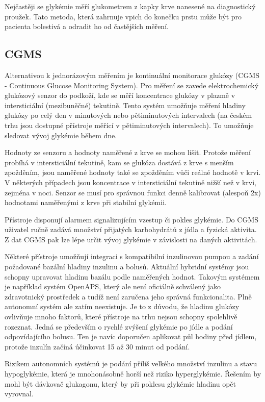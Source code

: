 Nejčastěji se glykémie měří glukometrem z kapky krve nanesené na diagnostický proužek. Tato metoda, která zahrnuje vpich do konečku prstu může být pro pacienta bolestivá a odradit ho od častějších měření. \cite{Diabetes.Pelikan}

\subsection{CGMS}

Alternativou k jednorázovým měřením je kontinuální monitorace glukózy (CGMS - Continuous Glucose Monitoring System). Pro měření se zavede elektrochemický glukózový senzor do podkoží, kde se měří koncentrace glukózy v plazmě v intersticiální (mezibuněčné) tekutině. Tento systém umožňuje měření hladiny glukózy po celý den v minutových nebo pětiminutových intervalech (na českém trhu jsou dostupné přístroje měřící v pětiminutových intervalech). To umožňuje sledovat vývoj glykémie během dne.

Hodnoty ze senzoru a hodnoty naměřené z krve se mohou lišit. Protože měření probíhá v intersticiální tekutině, kam se glukóza dostává z krve s menším zpožděním, jsou naměřené hodnoty také se zpožděním vůči reálné hodnotě v krvi. V některých případech jsou koncentrace v intersticiální tekutině nižší než v krvi, zejména v noci. Senzor se musí pro správnou funkci denně kalibrovat (alespoň 2x) hodnotami naměřenými z krve při stabilní glykémii. \citep{Diabetes.Perusicova}

Přístroje disponují alarmem signalizujícím vzestup či pokles glykémie. Do CGMS uživatel ručně zadává množství přijatých karbohydrátů z jídla a fyzická aktivita. Z dat CGMS pak lze lépe určit vývoj glykémie v závislosti na daných aktivitách.

Některé přístroje umožňují integraci s kompatibilní inzulinovou pumpou a zadání požadované bazální hladiny inzulinu a bolusů. Aktuální hybridní systémy jsou schopny upravovat hladinu bazálu podle naměřených hodnot. Takovým systémem je například systém OpenAPS, který ale není oficiálně schválený jako zdravotnický prostředek a tudíž není zaručena jeho správná funkcionalita. Plně autonomní systém ale zatím neexistuje. Je to z důvodu, že hladinu glukózy ovlivňuje mnoho faktorů, které přístroje na trhu nejsou schopny spolehlivě rozeznat. Jedná se především o rychlé zvýšení glykémie po jídle a podání odpovídajícího bolusu. Ten je navíc doporučen aplikovat půl hodiny před jídlem, protože inzulín začíná účinkovat 15 až 30 minut od podání.

Rizikem autonomních systémů je podání příliš velkého množství inzulinu a stavu hypoglykémie, která je mnohonásobně horší než riziko hyperglykémie. Řešením by mohl být dávkovač glukagonu, který by při poklesu glykémie hladinu opět vyrovnal. \citep{cukrovka.cz}
